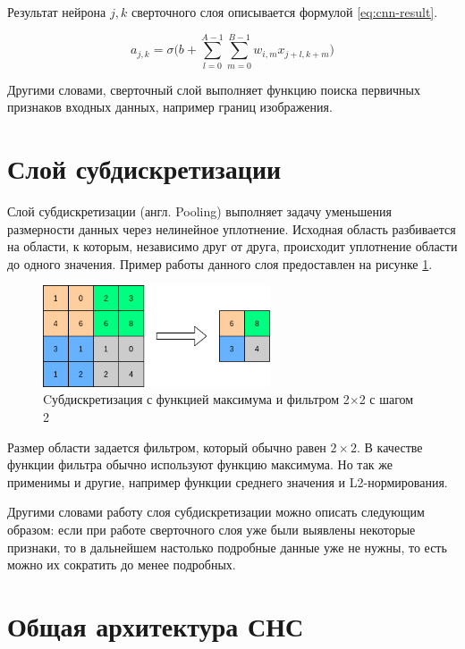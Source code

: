 Результат нейрона $j,k$ сверточного слоя описывается формулой \ref{eq:cnn-result}.

\begin{equation}\label{eq:cnn-result}
a_{j,k} = \sigma \Bigg(b + \sum_{l=0}^{A-1} \sum_{m=0}^{B-1} w_{i,m}x_{j+l,k+m}\Bigg)
\end{equation}

Другими словами, сверточный слой выполняет функцию поиска первичных признаков входных данных, например границ изображения.

\section*{Слой субдискретизации}

Слой субдискретизации (англ. Pooling) выполняет задачу уменьшения размерности данных через нелинейное уплотнение. Исходная область разбивается на области, к которым, независимо друг от друга, происходит уплотнение области до одного значения. Пример работы данного слоя предоставлен на рисунке \ref{anal:CNN-pooling}.

\begin{figure}[!h]
	\centering
	\includegraphics[width=0.6\textwidth]{inc/img/pooling}
	\caption{Cубдискретизация с функцией максимума и фильтром 2$\times$2 с шагом 2}
	\label{anal:CNN-pooling}
\end{figure}

Размер области задается фильтром, который обычно равен $2 \times 2$. В качестве функции фильтра обычно используют функцию максимума. Но так же применимы и другие, например функции среднего значения и L2-нормирования. 

Другими словами работу слоя субдискретизации можно описать следующим образом: если при работе сверточного слоя уже были выявлены некоторые признаки, то в дальнейшем настолько подробные данные уже не нужны, то есть можно их сократить до менее подробных.

\section*{Общая архитектура СНС}

